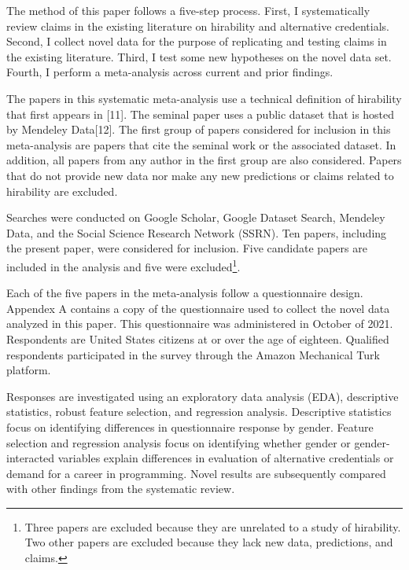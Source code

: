 \documentclass[review]{elsarticle}
\begin{document}
The method of this paper follows a five-step process.
First, I systematically review claims in the existing literature on hirability and alternative credentials.
Second, I collect novel data for the purpose of replicating and testing claims in the existing literature.
Third, I test some new hypotheses on the novel data set.
Fourth, I perform a meta-analysis across current and prior findings.

The papers in this systematic meta-analysis use a technical definition of hirability that first appears in [11].
The seminal paper uses a public dataset that is hosted by Mendeley Data[12].
The first group of papers considered for inclusion in this meta-analysis are
papers that cite the seminal work or the associated dataset.
In addition, all papers from any author in the first group are also considered.
Papers that do not provide new data nor make any new predictions or claims related to hirability are excluded.

Searches were conducted on Google Scholar, Google Dataset Search, Mendeley Data, and the Social Science Research Network (SSRN).
Ten papers, including the present paper, were considered for inclusion.
Five candidate papers are included in the analysis and five were excluded\footnote{
    Three papers are excluded because they are unrelated to a study of hirability.
    Two other papers are excluded because they lack new data, predictions, and claims.
}.

Each of the five papers in the meta-analysis follow a questionnaire design.
Appendex A contains a copy of the questionnaire used to collect the novel data analyzed in this paper.
This questionnaire was administered in October of 2021.
Respondents are United States citizens at or over the age of eighteen.
Qualified respondents participated in the survey through the Amazon Mechanical Turk platform.

Responses are investigated using an exploratory data analysis (EDA),
descriptive statistics,
robust feature selection,
and regression analysis.
Descriptive statistics focus on identifying differences in questionnaire response by gender.
Feature selection and regression analysis focus on identifying whether gender or gender-interacted variables
explain differences in evaluation of alternative credentials or demand for a career in programming.
Novel results are subsequently compared with other findings from the systematic review.
\end{document}
